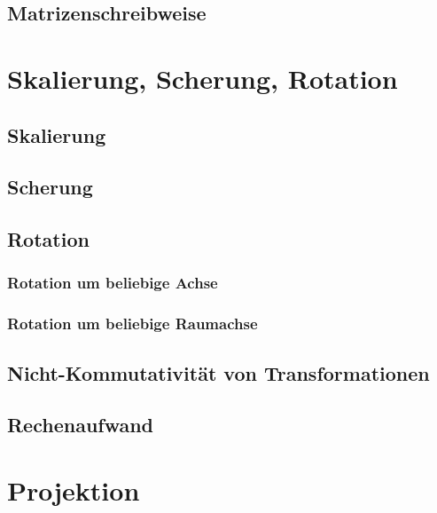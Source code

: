 \documentclass[a4paper, 11pt, accentcolor = tud3b]{tudreport}
\begin{document}
			\subsection{Matrizenschreibweise} %

		\section{Skalierung, Scherung, Rotation} %

			\subsection{Skalierung} %

			\subsection{Scherung} %

			\subsection{Rotation} %

				\subsubsection{Rotation um beliebige Achse} %

				\subsubsection{Rotation um beliebige Raumachse} %

			\subsection{Nicht-Kommutativität von Transformationen} %

			\subsection{Rechenaufwand} %

		\section{Projektion} %
\end{document}
